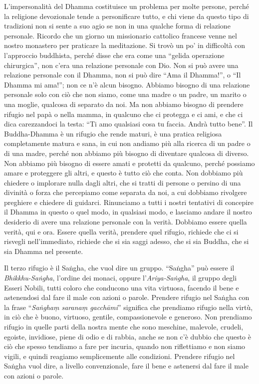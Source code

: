 L'impersonalità del Dhamma costituisce un problema per molte persone,
perché la religione devozionale tende a personificare tutto, e chi viene
da questo tipo di tradizioni non si sente a suo agio se non in una
qualche forma di relazione personale. Ricordo che un giorno un
missionario cattolico francese venne nel nostro monastero per praticare
la meditazione. Si trovò un po' in difficoltà con l'approccio buddhista,
perché disse che era come una ``gelida operazione chirurgica'', non
c'era una relazione personale con Dio. Non si può avere una relazione
personale con il Dhamma, non si può dire ``Ama il Dhamma!'', o ``Il
Dhamma mi ama!''; non ce n'è alcun bisogno. Abbiamo bisogno di una
relazione personale solo con ciò che non siamo, come una madre o un
padre, un marito o una moglie, qualcosa di separato da noi. Ma non
abbiamo bisogno di prendere rifugio nel papà o nella mamma, in qualcuno
che ci protegga e ci ami, e che ci dica carezzandoci la testa: ``Ti amo
qualsiasi cosa tu faccia. Andrà tutto bene''. Il Buddha-Dhamma è un
rifugio che rende maturi, è una pratica religiosa completamente matura e
sana, in cui non andiamo più alla ricerca di un padre o di una madre,
perché non abbiamo più bisogno di diventare qualcosa di diverso. Non
abbiamo più bisogno di essere amati e protetti da qualcuno, perché
possiamo amare e proteggere gli altri, e questo è tutto ciò che conta.
Non dobbiamo più chiedere o implorare nulla dagli altri, che si tratti
di persone o persino di una divinità o forza che percepiamo come
separata da noi, a cui dobbiamo rivolgere preghiere e chiedere di
guidarci. Rinunciamo a tutti i nostri tentativi di concepire il Dhamma
in questo o quel modo, in qualsiasi modo, e lasciamo andare il nostro
desiderio di avere una relazione personale con la verità. Dobbiamo
essere quella verità, qui e ora. Essere quella verità, prendere quel
rifugio, richiede che ci si risvegli nell'immediato, richiede che si sia
saggi adesso, che si sia Buddha, che si sia Dhamma nel presente.

Il terzo rifugio è il Saṅgha, che vuol dire un gruppo. ``Saṅgha'' può
essere il \emph{Bhikkhu-Saṅgha}, l'ordine dei monaci, oppure
l'\emph{Ariya-Saṅgha}, il gruppo degli Esseri Nobili, tutti
coloro che conducono una vita virtuosa, facendo il bene e astenendosi
dal fare il male con azioni o parole. Prendere rifugio nel Saṅgha con la
frase ``\emph{Saṅghaṃ saranaṃ gacchāmi}'' significa che prendiamo
rifugio nella virtù, in ciò che è buono, virtuoso, gentile,
compassionevole e generoso. Non prendiamo rifugio in quelle parti della
nostra mente che sono meschine, malevole, crudeli, egoiste, invidiose,
piene di odio e di rabbia, anche se non c'è dubbio che questo è ciò che
spesso tendiamo a fare per incuria, quando non riflettiamo e non siamo
vigili, e quindi reagiamo semplicemente alle condizioni. Prendere
rifugio nel Saṅgha vuol dire, a livello convenzionale, fare il bene e
astenersi dal fare il male con azioni o parole.

